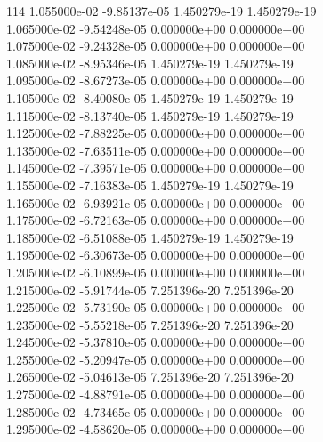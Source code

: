 114	1.055000e-02	-9.85137e-05	1.450279e-19	1.450279e-19	\\ 	1.065000e-02	-9.54248e-05	0.000000e+00	0.000000e+00	\\ 	1.075000e-02	-9.24328e-05	0.000000e+00	0.000000e+00	\\ 	1.085000e-02	-8.95346e-05	1.450279e-19	1.450279e-19	\\ 	1.095000e-02	-8.67273e-05	0.000000e+00	0.000000e+00	\\ 	1.105000e-02	-8.40080e-05	1.450279e-19	1.450279e-19	\\ 	1.115000e-02	-8.13740e-05	1.450279e-19	1.450279e-19	\\ 	1.125000e-02	-7.88225e-05	0.000000e+00	0.000000e+00	\\ 	1.135000e-02	-7.63511e-05	0.000000e+00	0.000000e+00	\\ 	1.145000e-02	-7.39571e-05	0.000000e+00	0.000000e+00	\\ 	1.155000e-02	-7.16383e-05	1.450279e-19	1.450279e-19	\\ 	1.165000e-02	-6.93921e-05	0.000000e+00	0.000000e+00	\\ 	1.175000e-02	-6.72163e-05	0.000000e+00	0.000000e+00	\\ 	1.185000e-02	-6.51088e-05	1.450279e-19	1.450279e-19	\\ 	1.195000e-02	-6.30673e-05	0.000000e+00	0.000000e+00	\\ 	1.205000e-02	-6.10899e-05	0.000000e+00	0.000000e+00	\\ 	1.215000e-02	-5.91744e-05	7.251396e-20	7.251396e-20	\\ 	1.225000e-02	-5.73190e-05	0.000000e+00	0.000000e+00	\\ 	1.235000e-02	-5.55218e-05	7.251396e-20	7.251396e-20	\\ 	1.245000e-02	-5.37810e-05	0.000000e+00	0.000000e+00	\\ 	1.255000e-02	-5.20947e-05	0.000000e+00	0.000000e+00	\\ 	1.265000e-02	-5.04613e-05	7.251396e-20	7.251396e-20	\\ 	1.275000e-02	-4.88791e-05	0.000000e+00	0.000000e+00	\\ 	1.285000e-02	-4.73465e-05	0.000000e+00	0.000000e+00	\\ 	1.295000e-02	-4.58620e-05	0.000000e+00	0.000000e+00	\\ \hline
